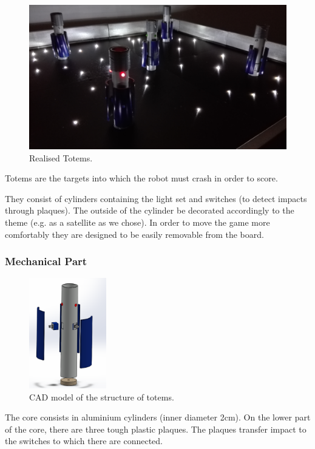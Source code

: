 \documentclass[a4paper,twoside]{book}
\begin{document}
\begin{figure}[h]
\includegraphics[width=\linewidth]{img/IMG_20160616_111854} 
\caption{Realised Totems.}
\end{figure}

Totems are the targets into which the robot must crash in order to score.

They consist of cylinders containing the light set and switches (to detect impacts through plaques). The outside of the cylinder be decorated accordingly to the theme (e.g. as a satellite as we chose). In order to move the game more comfortably they are designed to be easily removable from the board.

\subsubsection{Mechanical Part}

\begin{figure} 
    \centering
    \includegraphics[width=0.3\textwidth]{img/totem_nuovo1}
    \caption{CAD model of the structure of totems.}
\end{figure}

The core consists in aluminium cylinders (inner diameter 2cm). On the lower part of the core, there are three tough plastic plaques. The plaques transfer impact to the switches to which there are connected.
\end{document}
